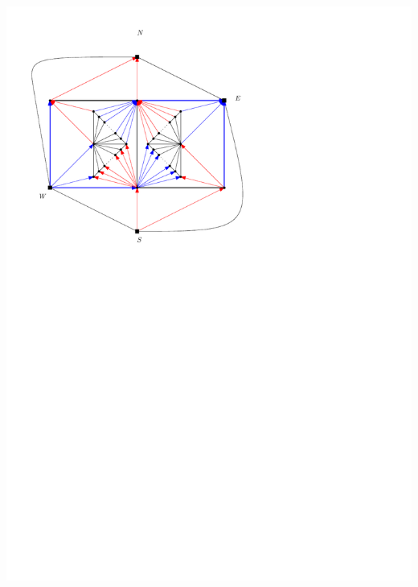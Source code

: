 \documentclass[a4paper]{article}
\begin{document}
\includegraphics[width=\textwidth]{fixExtension/img/manymany2}
\clearpage%
\end{document}
